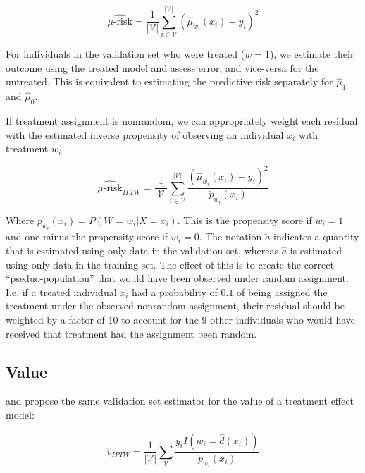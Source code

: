 \begin{equation}
	\widehat{\mu\text{-risk}} = \frac{1}{|\mathcal{V}|} \sum_{i \in \mathcal{V}}^{|\mathcal{V}|}  
	(\hat \mu_{w_i} (x_i) - y_i)^2
\label{murisk}
\end{equation}
 
For individuals in the validation set who were treated ($w=1$), we estimate their outcome using the treated model and assess error, and vice-versa for the untreated. This is equivalent to estimating the predictive risk separately for $\hat\mu_1$ and $\hat\mu_0$. 

If treatment assignment is nonrandom, we can appropriately weight each residual with the estimated inverse propensity of observing an individual $x_i$ with treatment $w_i$

\begin{equation}
	\widehat{\mu\text{-risk}}_{IPTW} = \frac{1}{|\mathcal{V}|} \sum_{i \in \mathcal{V}}^{|\mathcal{V}|}  
	\frac{(\hat \mu_{w_i} (x_i) - y_i)^2}{\check p_{w_i}(x_i)}
\label{murisk-iptw}
\end{equation}

Where $p_{w_i}(x_i) = P(W=w_i | X=x_i)$. This is the propensity score if $w_i = 1$ and one minus the propensity score if $w_i = 0$. The notation $\check a$ indicates a quantity that is estimated using only data in the validation set, whereas $\hat a$ is estimated using only data in the training set. The effect of this is to create the correct ``pseduo-population'' that would have been observed under random assignment. I.e. if a treated individual $x_i$ had a probability of $0.1$ of being assigned the treatment under the observed nonrandom assignment, their residual should be weighted by a factor of $10$ to account for the 9 other individuals who would have received that treatment had the assignment been random.

\subsection{Value}
\label{sec:value}

\citet{Kapelner:3baXYEjR} and \citet{Zhao:2017wa} propose the same validation set estimator for the value of a treatment effect model:

\begin{equation}
\label{value}
\hat v_{IPTW} = \frac{1}{|\mathcal{V}|}\sum_{\mathcal{V}} \frac{y_i I(w_i=\hat d(x_i))}{\check p_{w_i}(x_i)}
\end{equation}

